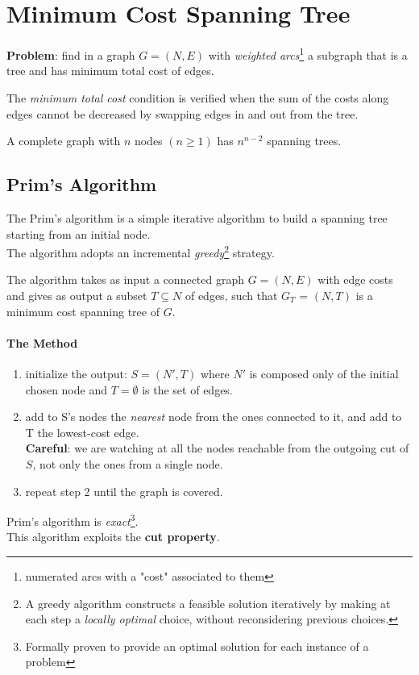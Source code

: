     \section{Minimum Cost Spanning Tree}
        \textbf{Problem}: find in a graph $G = (N, E)$ with \textit{weighted arcs}\footnote{numerated arcs with a "cost" associated to them} a subgraph that is a tree and has minimum total cost of edges.
        
        The \emph{minimum total cost} condition is verified when the sum of the costs along edges cannot be decreased by swapping edges in and out from the tree.
        
        \begin{theorem}[Cayley, 1889]
            A complete graph with $n$ nodes $(n \geq 1)$ has $n^{n-2}$ spanning trees.
        \end{theorem}
       

        \subsection{Prim's Algorithm}
            The Prim's algorithm is a simple iterative algorithm to build a spanning tree starting from an initial node.\\
            The algorithm adopts an incremental \emph{greedy}\footnote{A greedy algorithm constructs a feasible solution iteratively by
            making at each step a \emph{locally optimal} choice, without reconsidering previous choices.} strategy.

            The algorithm takes as input a connected graph $G = (N, E)$ with edge costs and gives as output a subset $T \subseteq N$
            of edges, such that $G_T$ = $(N, T)$ is a minimum cost spanning tree of $G$.

            \paragraph*{The Method}
            \begin{enumerate}
                \item initialize the output: $S = (N', T)$ where $N'$ is composed only of the initial chosen node and $T = \emptyset$ is the set of edges.
                \item add to S's nodes the \emph{nearest} node from the ones connected to it, and add to T the lowest-cost edge.\\\textbf{Careful}: we are watching at \emph{}{all the nodes reachable from the outgoing cut of $S$}, not only the ones from a single node.
                \item repeat step 2 until the graph is covered.
            \end{enumerate}
            Prim's algorithm is \emph{exact}\footnote{Formally proven to provide an optimal solution for each instance of a problem}.\\
            This algorithm exploits the \textbf{cut property}.

